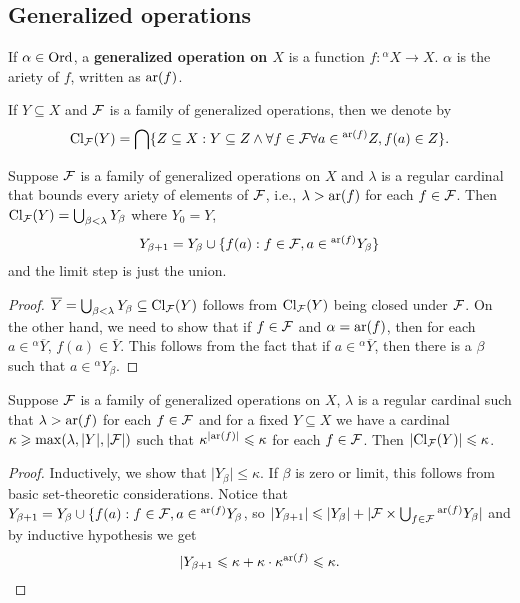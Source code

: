 \documentclass[twoside,openright,titlepage,numbers=noenddot,%
               headinclude,footinclude,cleardoublepage=empty,abstract=on,
               BCOR=23mm,paper=letter,fontsize=11pt
               ]{scrreprt}
\begin{document}
\subsection{Generalized operations}
\begin{definition}
    If $\alpha \in \mathrm{Ord}$, a \textbf{generalized operation on $X$} is a function $f: {}^{\alpha}X \to X$. $\alpha$ is the ariety of $f$, written as $\mathrm{ar}(f)$.
\end{definition}
\begin{definition}
    If $Y \subseteq X$ and $\mathcal{F}$ is a family of generalized operations, then we denote by 
    \[ \mathrm{Cl}_{\mathcal{F}}(Y) = \bigcap \{Z \subseteq X: Y \subseteq Z \land \forall f \in \mathcal{F} \forall a \in {}^{\mathrm{ar}(f)}Z, f(a) \in Z\}. \]
\end{definition}
\begin{theorem}
    Suppose $\mathcal{F}$ is a family of generalized operations on $X$ and $\lambda$ is a regular cardinal that bounds every ariety of elements of $\mathcal{F}$, i.e., $\lambda > \mathrm{ar}(f)$ for each $f \in \mathcal{F}$.
    Then $\mathrm{Cl}_{\mathcal{F}}(Y) = \bigcup_{\beta < \lambda} Y_\beta$ where $Y_0 = Y$,
    \[ Y_{\beta+1} = Y_\beta \cup \{ f(a): f \in \mathcal{F}, a \in {}^{\mathrm{ar}(f)}Y_\beta \} \]
    and the limit step is just the union.
\end{theorem}
\begin{proof}
    $\overline{Y} = \bigcup_{\beta < \lambda} Y_\beta \subseteq \mathrm{Cl}_{\mathcal{F}}(Y)$ follows from $\mathrm{Cl}_{\mathcal{F}}(Y)$ being closed under $\mathcal{F}$. On the other hand, we need to show that if $f \in \mathcal{F}$ and $\alpha = \mathrm{ar}(f)$, then for each $a \in {}^{\alpha}\overline{Y}$, $f(a) \in \overline{Y}$. This follows from the fact that if $a \in {}^{\alpha}\overline{Y}$, then there is a $\beta$ such that $a \in {}^{\alpha}Y_\beta$.
\end{proof}
\begin{theorem}
    Suppose $\mathcal{F}$ is a family of generalized operations on $X$, $\lambda$ is a regular cardinal such that $\lambda > \mathrm{ar}(f)$ for each $f \in \mathcal{F}$ and for a fixed $Y \subseteq X$ we have a cardinal $\kappa \geqslant \max(\lambda,\vert Y\vert, \vert \mathcal{F} \vert)$ such that $\kappa^{\vert \mathrm{ar}(f) \vert} \leqslant \kappa$ for each $f \in \mathcal{F}$. Then $\vert \mathrm{Cl}_{\mathcal{F}}(Y) \vert \leqslant \kappa$.
\end{theorem}
\begin{proof}
    Inductively, we show that $\vert Y_\beta \vert \leq \kappa$. If $\beta$ is zero or limit, this follows from basic set-theoretic considerations.
    Notice that $Y_{\beta+1} = Y_\beta \cup \{f(a): f \in \mathcal{F}, a \in {}^{\mathrm{ar}(f)}Y_\beta$, so $\vert Y_{\beta + 1} \vert \leqslant \vert Y_\beta \vert + \vert \mathcal{F} \times \bigcup_{f \in \mathcal{F}} {}^{\mathrm{ar}(f)}Y_\beta \vert$ and by inductive hypothesis we get
    \[ \vert Y_{\beta +1} \leqslant \kappa + \kappa \cdot \kappa^{\mathrm{ar}(f)} \leqslant \kappa. \]
\end{proof}
\end{document}
